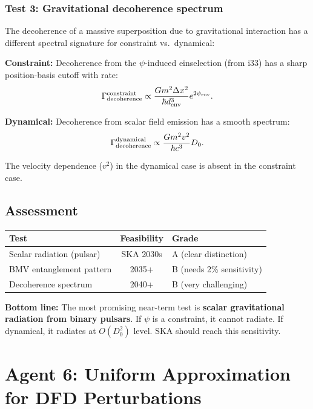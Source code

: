 \documentclass[11pt,a4paper]{article}
\begin{document}
\subsubsection{Test 3: Gravitational decoherence spectrum}

The decoherence of a massive superposition due to gravitational interaction has a different spectral signature for constraint vs.\ dynamical:

\textbf{Constraint:} Decoherence from the $\psi$-induced einselection (from i33) has a sharp position-basis cutoff with rate:
\begin{equation}
\Gamma_{\rm decoherence}^{\rm constraint} \propto \frac{Gm^2\Delta x^2}{\hbar d_{\rm env}^3}e^{2\psi_{\rm env}}.
\end{equation}

\textbf{Dynamical:} Decoherence from scalar field emission has a smooth spectrum:
\begin{equation}
\Gamma_{\rm decoherence}^{\rm dynamical} \propto \frac{Gm^2 v^2}{\hbar c^3}D_0.
\end{equation}

The velocity dependence ($v^2$) in the dynamical case is absent in the constraint case.

\subsection{Assessment}

\begin{center}
\begin{tabular}{lcl}
\toprule
\textbf{Test} & \textbf{Feasibility} & \textbf{Grade} \\
\midrule
Scalar radiation (pulsar) & SKA 2030s & A (clear distinction) \\
BMV entanglement pattern & 2035+ & B (needs 2\% sensitivity) \\
Decoherence spectrum & 2040+ & B (very challenging) \\
\bottomrule
\end{tabular}
\end{center}

\textbf{Bottom line:} The most promising near-term test is \textbf{scalar gravitational radiation from binary pulsars}. If $\psi$ is a constraint, it cannot radiate. If dynamical, it radiates at $O(D_0^2)$ level. SKA should reach this sensitivity.

\newpage
\section{Agent 6: Uniform Approximation for DFD Perturbations}
\label{sec:agent6}
\end{document}
